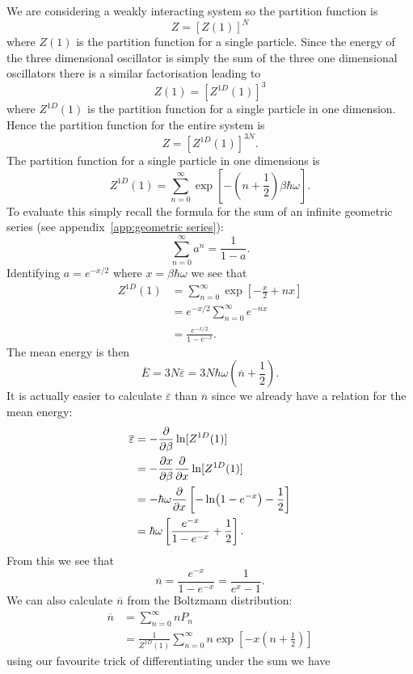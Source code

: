\documentclass[a4paper]{article}
\newcommand{\mean}[1]{\overline{#1}}
\begin{document}
    We are considering a weakly interacting system so the partition function is
    \[Z = [Z(1)]^N\]
    where \(Z(1)\) is the partition function for a single particle.
    Since the energy of the three dimensional oscillator is simply the sum of the three one dimensional oscillators there is a similar factorisation leading to
    \[Z(1) = [Z^{1D}(1)]^3\]
    where \(Z^{1D}(1)\) is the partition function for a single particle in one dimension.
    Hence the partition function for the entire system is
    \[Z = [Z^{1D}(1)]^{3N}.\]
    The partition function for a single particle in one dimensions is
    \[Z^{1D}(1) = \sum_{n=0}^{\infty} \exp\left[-\left(n + \frac{1}{2}\right)\beta\hbar\omega\right].\]
    To evaluate this simply recall the formula for the sum of an infinite geometric series (see appendix~\ref{app:geometric series}):
    \[\sum_{n=0}^{\infty} a^n = \frac{1}{1 - a}.\]
    Identifying \(a = e^{-x/2}\) where \(x = \beta\hbar\omega\) we see that
    \begin{align*}
        Z^{1D}(1) &= \sum_{n=0}^{\infty} \exp\left[-\frac{x}{2} + nx \right]\\
        &= e^{-x/2}\sum_{n=0}^{\infty} e^{-nx}\\
        &= \frac{e^{-x/2}}{1 - e^{-x}}.
    \end{align*}
    The mean energy is then
    \[\mean{E} = 3N\mean{\varepsilon} = 3N\hbar\omega\left(\mean{n} + \frac{1}{2}\right).\]
    It is actually easier to calculate \(\mean{\varepsilon}\) than \(\mean{n}\) since we already have a relation for the mean energy:
    \begin{align*}
        \mean{\varepsilon} &= -\pdv{\beta}\ln[Z^{1D}(1)]\\
        &= -\pdv{x}{\beta}\pdv{x}\ln[Z^{1D}(1)]\\
        &= -\hbar\omega\pdv{x}\left[-\ln(1 - e^{-x}) - \frac{1}{2}\right]\\
        &= \hbar\omega\left[\frac{e^{-x}}{1 - e^{-x}} + \frac{1}{2}\right].
    \end{align*}
    From this we see that
    \[\mean{n} = \frac{e^{-x}}{1 - e^{-x}} = \frac{1}{e^{x} - 1}.\]
    We can also calculate \(\mean{n}\) from the Boltzmann distribution:
    \begin{align*}
        \mean{n} &= \sum_{n=0}^{\infty} nP_n\\
        &= \frac{1}{Z^{1D}(1)} \sum_{n=0}^{\infty} n\exp\left[-x\left(n + \frac{1}{2}\right)\right]
    \end{align*}
    using our favourite trick of differentiating under the sum we have
\end{document}
